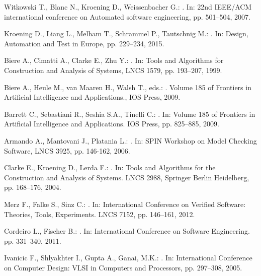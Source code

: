 \documentclass{acm_sen_article}
\begin{document}
{{\begin{thebibliography}{1}
Witkowski T., Blanc N., Kroening D., Weissenbacher G.:
.
\newblock In: 22nd IEEE/ACM international conference on Automated software engineering, pp. 501--504, 2007.

Kroening D., Liang L., Melham T., Schrammel P., Tautschnig M.:
. 
\newblock In: Design, Automation and Test in Europe, pp. 229--234, 2015.

Biere A., Cimatti A., Clarke E., Zhu Y.:
. 
\newblock In: Tools and Algorithms for Construction and Analysis of Systems, LNCS 1579, pp. 193--207, 1999.

Biere A., Heule M., van Maaren H., Walsh T., eds.:
.
\newblock Volume 185 of Frontiers in Artificial Intelligence and Applications., {IOS} Press, 2009.

Barrett C., Sebastiani R., Seshia S.A., Tinelli C.:
. 
\newblock In: Volume 185 of Frontiers in Artificial Intelligence and Applications. IOS Press, pp. 825--885, 2009.

Armando A., Mantovani J., Platania L.:
. 
\newblock In: {SPIN} Workshop on Model Checking Software, LNCS 3925, pp. 146-162, 2006.

Clarke E., Kroening D., Lerda F.:
.
\newblock In: Tools and Algorithms for the Construction and Analysis of Systems. LNCS 2988, Springer Berlin Heidelberg, pp. 168--176, 2004.

Merz F., Falke S., Sinz C.:
.
\newblock In: International Conference on Verified Software: Theories, Tools, Experiments. LNCS 7152, pp. 146--161, 2012.

Cordeiro L., Fischer B.:
.
\newblock In: International Conference on Software Engineering. pp. 331--340, 2011.

Ivanicic F., Shlyakhter I., Gupta A., Ganai, M.K.:
.
\newblock In: International Conference on Computer Design: VLSI in Computers and Processors, pp. 297--308, 2005.


\end{thebibliography}}}
\end{document}
